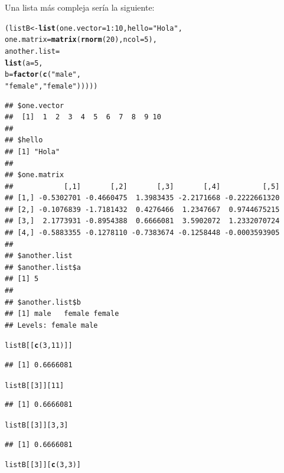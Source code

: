 \documentclass{config/apuntes}\usepackage[]{graphicx}\usepackage[]{xcolor}
\makeatletter
\newcommand{\hlnum}[1]{\textcolor[rgb]{0.686,0.059,0.569}{#1}}%
\newcommand{\hlsng}[1]{\textcolor[rgb]{0.192,0.494,0.8}{#1}}%
\newcommand{\hlopt}[1]{\textcolor[rgb]{0,0,0}{#1}}%
\newcommand{\hldef}[1]{\textcolor[rgb]{0.345,0.345,0.345}{#1}}%
\newcommand{\hlkwb}[1]{\textcolor[rgb]{0.69,0.353,0.396}{#1}}%
\newcommand{\hlkwc}[1]{\textcolor[rgb]{0.333,0.667,0.333}{#1}}%
\newcommand{\hlkwd}[1]{\textcolor[rgb]{0.737,0.353,0.396}{\textbf{#1}}}%
\newenvironment{kframe}{%
 \def\at@end@of@kframe{}%
 \ifinner\ifhmode%
  \def\at@end@of@kframe{\end{minipage}}%
  \begin{minipage}{\columnwidth}%
 \fi\fi%
 \def\FrameCommand##1{\hskip\@totalleftmargin \hskip-\fboxsep
 \colorbox{shadecolor}{##1}\hskip-\fboxsep
     \hskip-\linewidth \hskip-\@totalleftmargin \hskip\columnwidth}%
 \MakeFramed {\advance\hsize-\width
   \@totalleftmargin\z@ \linewidth\hsize
   \@setminipage}}%
 {\par\unskip\endMakeFramed%
 \at@end@of@kframe}
\newenvironment{knitrout}{}{} %
\makeatother
\begin{document}
Una lista más compleja sería la siguiente:
\begin{knitrout}
\color{fgcolor}\begin{kframe}
\begin{alltt}
\hldef{(listB} \hlkwb{<-} \hlkwd{list}\hldef{(}\hlkwc{one.vector} \hldef{=} \hlnum{1}\hlopt{:}\hlnum{10}\hldef{,}  \hlkwc{hello} \hldef{=} \hlsng{"Hola"}\hldef{,}
               \hlkwc{one.matrix} \hldef{=} \hlkwd{matrix}\hldef{(}\hlkwd{rnorm}\hldef{(}\hlnum{20}\hldef{),} \hlkwc{ncol} \hldef{=} \hlnum{5}\hldef{),}
               \hlkwc{another.list} \hldef{=}
               \hlkwd{list}\hldef{(}\hlkwc{a} \hldef{=} \hlnum{5}\hldef{,}
                    \hlkwc{b} \hldef{=} \hlkwd{factor}\hldef{(}\hlkwd{c}\hldef{(}\hlsng{"male"}\hldef{,}
                      \hlsng{"female"}\hldef{,} \hlsng{"female"}\hldef{)))))}
\end{alltt}
\begin{verbatim}
## $one.vector
##  [1]  1  2  3  4  5  6  7  8  9 10
## 
## $hello
## [1] "Hola"
## 
## $one.matrix
##            [,1]       [,2]       [,3]       [,4]          [,5]
## [1,] -0.5302701 -0.4660475  1.3983435 -2.2171668 -0.2222661320
## [2,] -0.1076839 -1.7181432  0.4276466  1.2347667  0.9744675215
## [3,]  2.1773931 -0.8954388  0.6666081  3.5902072  1.2332070724
## [4,] -0.5883355 -0.1278110 -0.7383674 -0.1258448 -0.0003593905
## 
## $another.list
## $another.list$a
## [1] 5
## 
## $another.list$b
## [1] male   female female
## Levels: female male
\end{verbatim}
\begin{alltt}
\hldef{listB[[}\hlkwd{c}\hldef{(}\hlnum{3}\hldef{,} \hlnum{11}\hldef{)]]}
\end{alltt}
\begin{verbatim}
## [1] 0.6666081
\end{verbatim}
\begin{alltt}
\hldef{listB[[}\hlnum{3}\hldef{]][}\hlnum{11}\hldef{]}
\end{alltt}
\begin{verbatim}
## [1] 0.6666081
\end{verbatim}
\begin{alltt}
\hldef{listB[[}\hlnum{3}\hldef{]][}\hlnum{3}\hldef{,} \hlnum{3}\hldef{]}
\end{alltt}
\begin{verbatim}
## [1] 0.6666081
\end{verbatim}
\begin{alltt}
\hldef{listB[[}\hlnum{3}\hldef{]][}\hlkwd{c}\hldef{(}\hlnum{3}\hldef{,} \hlnum{3}\hldef{)]}

\end{alltt}
\end{kframe}
\end{knitrout}
\end{document}
